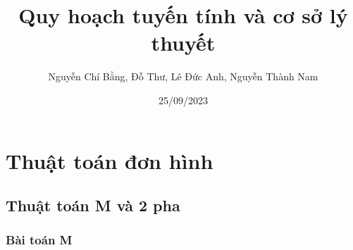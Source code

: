 \documentclass{article}
\title{Quy hoạch tuyến tính và cơ sở lý thuyết}
\author{Nguyễn Chí Bằng, Đỗ Thư, Lê Đức Anh, Nguyễn Thành Nam}
\date{25/09/2023}
\begin{document}
\maketitle



\tableofcontents

\section{Thuật toán đơn hình}
    \subsection{Thuật toán M và 2 pha}
            \subsubsection{Bài toán M}
\end{document}

